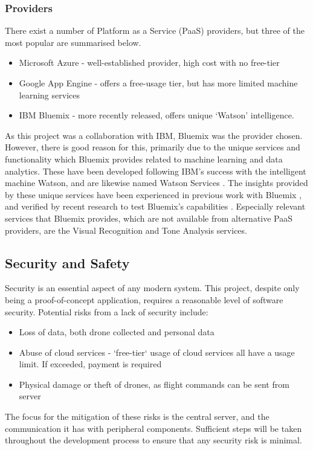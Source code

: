 \documentclass{article}
\begin{document}
\subsubsection{Providers}
There exist a number of Platform as a Service (PaaS) providers, but three of the most popular are summarised below.
\begin{itemize}
    \item Microsoft Azure - well-established provider, high cost with no free-tier
    \item Google App Engine - offers a free-usage tier, but has more limited machine learning services
    \item IBM Bluemix - more recently released, offers unique `Watson' intelligence.
\end{itemize}
As this project was a collaboration with IBM, Bluemix was the provider chosen. However, there is good reason for this, primarily due to the unique services and functionality which Bluemix provides related to machine learning and data analytics. These have been developed following IBM's success with the intelligent machine Watson, and are likewise named Watson Services \cite{Watson}. The insights provided by these unique services have been experienced in previous work with Bluemix \cite{EdgeOfSpace}, and verified by recent research to test Bluemix's capabilities \cite{Sentiment}. Especially relevant services that Bluemix provides, which are not available from alternative PaaS providers, are the Visual Recognition and Tone Analysis services.

\subsection{Security and Safety}
Security is an essential aspect of any modern system. This project, despite only being a proof-of-concept application, requires a reasonable level of software security. Potential risks from a lack of security include:
\begin{itemize}
	\item Loss of data, both drone collected and personal data
	\item Abuse of cloud services - `free-tier` usage of cloud services all have a usage limit. If exceeded, payment is required
	\item Physical damage or theft of drones, as flight commands can be sent from server
\end{itemize}
The focus for the mitigation of these risks is the central server, and the communication it has with peripheral components. Sufficient steps will be taken throughout the development process to ensure that any security risk is minimal.
\end{document}
